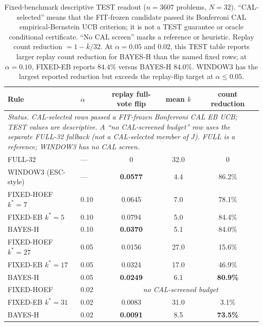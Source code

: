 \documentclass{article}
\theoremstyle{definition}
\theoremstyle{remark}
\begin{document}
\begin{table}[t]
\centering\small
\caption{Fixed-benchmark descriptive TEST readout ($n=3607$ problems,
$N=32$). ``CAL-selected'' means that the FIT-frozen candidate passed its
Bonferroni CAL empirical-Bernstein UCB criterion; it is not a TEST guarantee
or oracle conditional certificate. ``No CAL screen'' marks a reference
or heuristic. Replay count reduction $=1-\bar k/32$. At $\alpha=0.05$ and
$0.02$, this TEST table reports larger replay count reduction for BAYES-H than
the named fixed rows; at $\alpha=0.10$, FIXED-EB reports $84.4\%$ versus
BAYES-H $84.0\%$. WINDOW3 has the largest reported reduction but exceeds the
replay-flip target at $\alpha\le0.05$.}
\label{tab:main}
\begin{tabular}{llccc}
\toprule
Rule & $\alpha$ & replay full-vote flip & mean $k$ & count reduction \\
\midrule
\multicolumn{5}{p{0.92\linewidth}}{\textit{Status. CAL-selected rows passed a FIT-frozen Bonferroni CAL EB UCB; TEST values are descriptive. A ``no CAL-screened budget'' row uses the separate FULL-32 fallback (not a CAL-selected member of $J$). FULL is a reference; WINDOW3 has no CAL screen.}} \\
FULL-32 & --- & 0 & 32.0 & 0 \\
WINDOW3 (ESC-style) & --- & \textbf{0.0577} & 4.4 & 86.2\% \\
\midrule
FIXED-HOEF $k^*{=}7$  & 0.10 & 0.0645 & 7.0 & 78.1\% \\
FIXED-EB   $k^*{=}5$  & 0.10 & 0.0794 & 5.0 & 84.4\% \\
BAYES-H               & 0.10 & \textbf{0.0370} & 5.1 & 84.0\% \\
\midrule
FIXED-HOEF $k^*{=}27$ & 0.05 & 0.0156 & 27.0 & 15.6\% \\
FIXED-EB   $k^*{=}17$ & 0.05 & 0.0324 & 17.0 & 46.9\% \\
BAYES-H               & 0.05 & \textbf{0.0249} & 6.1 & \textbf{80.9\%} \\
\midrule
FIXED-HOEF & 0.02 & \multicolumn{3}{c}{\emph{no CAL-screened budget}} \\
FIXED-EB   $k^*{=}31$ & 0.02 & 0.0083 & 31.0 & 3.1\% \\
BAYES-H               & 0.02 & \textbf{0.0091} & 8.5 & \textbf{73.5\%} \\
\bottomrule
\end{tabular}
\end{table}
\end{document}

